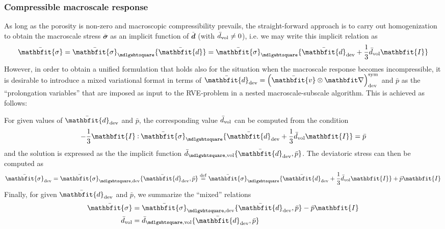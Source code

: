 \documentclass[10pt,a4paper,fleqn]{article}
\renewcommand{\ta}[1]{\mathbfit{#1}}
\renewcommand{\ts}[1]{\mathbfit{#1}}
\renewcommand{\Box}{\mdlgwhtsquare}
\begin{document}
\subsubsection{Compressible macroscale response}

As long as the porosity is non-zero and macroscopic compressibility prevails, the straight-forward approach is to carry out homogenization to obtain the macroscale stress $\bar{\ts\sigma}$ as an implicit function of $\bar{\ts d}$ (with $\bar{d}_{\mathrm{vol}}\neq 0$), i.e. we may write this implicit relation as
\begin{equation}
   \bar{\ts\sigma} = \bar{\ts\sigma}_\Box\{\bar{\ts d}\} = \bar{\ts\sigma}_\Box\{\bar{\ts d}_\dev +\frac13\bar{d}_\vol\ts I\}
\label{eq416a}
\end{equation}
However, in order to obtain a unified formulation that holds also for the situation when the macroscale response becomes incompressible, it is desirable to introduce a mixed variational format in terms of $\bar{\ts d}_\dev=\left(\bar{\ta v}\outerp\diff\right)^\sym_\dev$ and $\bar{p}$ as the ``prolongation variables'' that are imposed as input to the RVE-problem in a nested macroscale-subscale algorithm. This is achieved as follows:

For given values of $\bar{\ts d}_\dev$ and $\bar{p}$, the corresponding value $\bar{d}_{\mathrm{vol}}$ can be computed from the condition
\begin{equation}
    -\frac13 \ts I\dprod \bar{\ts\sigma}_\Box\{\bar{\ts d}_\dev +\frac13\bar{d}_\vol\ts I\} = \bar p
\label{eq416}
\end{equation}
and the solution is expressed as the the implicit function $\bar{d}_{\Box,\vol}\{\bar{\ts d}_\dev,\bar{p}\}$. The deviatoric stress can then be computed as
\begin{equation}
    \bar{\ts\sigma}_{\dev} = \bar{\ts\sigma}_{\Box,\dev}\{\bar{\ts d}_\dev,\bar p\} \defeq \bar{\ts\sigma}_\Box\{\bar{\ts d}_\dev + \frac13 \bar{d}_\vol\ts I\} + \bar{p}\ts{I}
\label{eq418}
\end{equation}
Finally, for given $\bar{\ts d}_\dev$ and $\bar{p}$, we summarize the ``mixed'' relations
\begin{align}
 \bar{\ts\sigma} & =  \bar{\ts\sigma}_{\Box,\dev}\{\bar{\ts d}_\dev,\bar p\} - \bar p\ts I
\label{eq418a}\\
 \bar{d}_\vol & =  \bar{d}_{\Box,\vol}\{\bar{\ts d}_\dev, \bar p\}
\label{eq418b}
\end{align}
\end{document}

